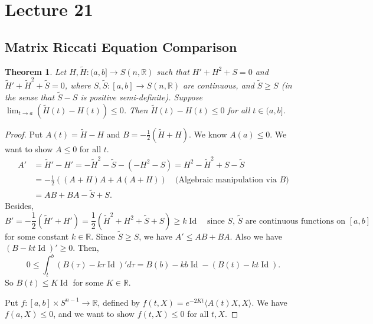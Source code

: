 \documentclass[11pt, a4paper]{article}
\theoremstyle{plain}
\newtheorem{theorem}{Theorem}[section]
\theoremstyle{definition}
\theoremstyle{remark}
\DeclareMathOperator{\Id}{Id}
\begin{document}
{
    \section{Lecture 21}

    \subsection{Matrix Riccati Equation Comparison}

\begin{theorem}
Let $H, \tilde{H} : (a,b] \to S(n, \mathbb{R})$ such that $H' + H^2 + S = 0$ and $\tilde{H}' + \tilde{H}^2 + \tilde{S} = 0$, where $S, \tilde{S} : [a,b] \to S(n, \mathbb{R})$ are continuous, and $\tilde{S} \ge S$ (in the sense that $\tilde S - S$ is positive semi-definite). Suppose $\lim_{t \to a} (\tilde{H}(t) - H(t)) \le 0$. Then $\tilde{H}(t) - H(t) \le 0$ for all $t \in (a, b]$.
\end{theorem}

\begin{proof}
Put $A(t) = \tilde{H} - H$ and $B = -\frac{1}{2}(\tilde{H} + H)$. We know $A(a) \le 0$. We want to show $A \le 0$ for all $t$.
\begin{align*}
    A' &= \tilde{H}' - H' = -\tilde{H}^2 - \tilde{S} - (-H^2 - S) = H^2 - \tilde{H}^2 + S - \tilde{S} \\
    &= -\frac{1}{2} \left( (A+H)A + A(A+H) \right) \quad \text{(Algebraic manipulation via $B$)} \\
    &= AB + BA - \tilde{S} + S.
\end{align*}
Besides, 
\[ B' = -\frac{1}{2}(\tilde{H}' + H') = \frac{1}{2}(\tilde{H}^2 + H^2 + \tilde{S} + S) \ge k\Id \quad\text{since $S,\,\tilde S$ are continuous functions on $[a,b]$ }\] 
for some constant $k \in \mathbb{R}$.
Since $\tilde{S} \ge S$, we have $A' \le AB + BA$. 
Also we have $(B - kt\Id)' \ge 0$. Then,
\[ 0 \le \int_t^b (B(\tau) - k\tau\Id)' d\tau = B(b) - kb\Id - (B(t) - kt\Id). \]
So $B(t) \le K\Id$ for some $K \in \mathbb{R}$.

Put $f: [a,b] \times S^{n-1} \to \mathbb{R}$, defined by $f(t,X) = e^{-2Kt} \langle A(t)X, X \rangle$. We have $f(a,X) \le 0$, and we want to show $f(t,X) \le 0$ for all $t,X$. 


\end{proof}}
\end{document}
